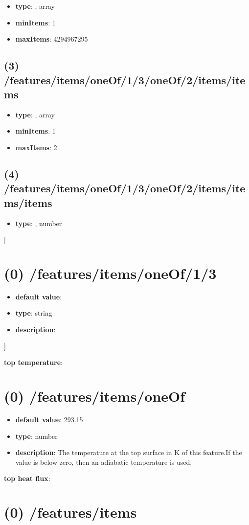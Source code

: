 \begin{itemize}[leftmargin=2em]\item {\bf type}: , array\item {\bf minItems}: 1
\item {\bf maxItems}: 4294967295
\end{itemize}\subsection{(3) /features/items/oneOf/1/3/oneOf/2/items/items}
\begin{itemize}[leftmargin=3em]\item {\bf type}: , array\item {\bf minItems}: 1
\item {\bf maxItems}: 2
\end{itemize}\subsection{(4) /features/items/oneOf/1/3/oneOf/2/items/items/items}
\begin{itemize}[leftmargin=4em]\item {\bf type}: , number\end{itemize}]\section{(0) /features/items/oneOf/1/3}
\begin{itemize}[leftmargin=0em]\item {\bf default value}: 
\item {\bf type}: string
\item {\bf description}: 
\end{itemize}]\item {\bf top temperature}: \section{(0) /features/items/oneOf}
\begin{itemize}[leftmargin=0em]\item {\bf default value}: 293.15
\item {\bf type}: number
\item {\bf description}: The temperature at the top surface in K of this feature.If the value is below zero, then an adiabatic temperature is used.
\end{itemize}\item {\bf top heat flux}: \section{(0) /features/items}
